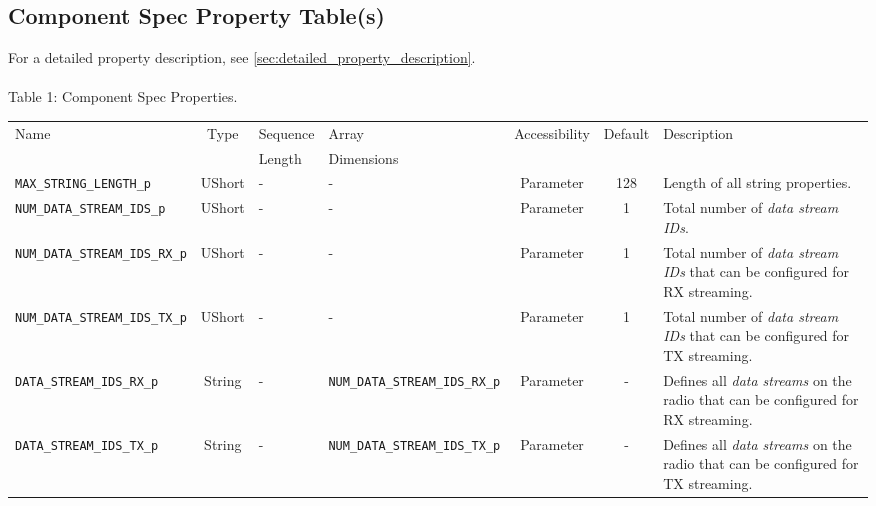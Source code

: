 \documentclass{article}
\begin{document}
\begin{landscape}

\section{Component Spec Property Table(s)}
  For a detailed property description, see \ref{sec:detailed_property_description}. \\ \\

	\noindent Table \hypertarget{tab1}{1}: Component Spec Properties.
	\begin{scriptsize}
		\begin{longtable}{|p{5.3cm}|c|p{3.5cm}|p{3.5cm}|c|c|p{4.4cm}|}
			\hline
			\rowcolor{blue}
			Name                                & Type   & Sequence & Array      & Accessibility       & Default & Description                                                                                \\
			\rowcolor{blue}
			                                    &        & Length   & Dimensions &                     &             &                                                                                            \\
			\hline
			\verb+MAX_STRING_LENGTH_p+ & UShort & -        & -          & Parameter           & 128     & Length of all string properties. \\
			\hline
			\verb+NUM_DATA_STREAM_IDS_p+           & UShort & -        & -          & Parameter           & 1       & Total number of \textit{data stream IDs}. \\
			\hline
			\verb+NUM_DATA_STREAM_IDS_RX_p+        & UShort & -        & -          & Parameter           & 1       & Total number of \textit{data stream IDs} that can be configured for RX streaming. \\
			\hline
			\verb+NUM_DATA_STREAM_IDS_TX_p+        & UShort & -        & -          & Parameter           & 1       & Total number of \textit{data stream IDs} that can be configured for TX streaming. \\
			\hline
			\verb+DATA_STREAM_IDS_RX_p+        & String & -        & \verb+NUM_DATA_STREAM_IDS_RX_p+ & Parameter           & -       & Defines all \textit{data streams} on the radio that can be configured for RX streaming. \\
			\hline
			\verb+DATA_STREAM_IDS_TX_p+        & String & -        & \verb+NUM_DATA_STREAM_IDS_TX_p+ & Parameter           & -       & Defines all \textit{data streams} on the radio that can be configured for TX streaming. \\

\end{longtable}
\end{scriptsize}
\end{landscape}
\end{document}
